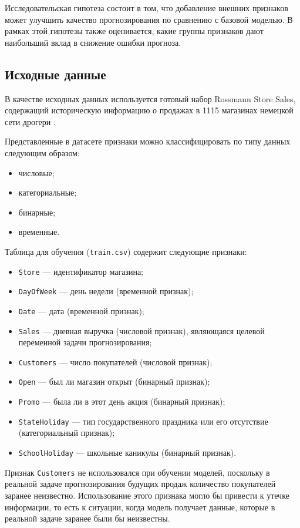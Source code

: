 \documentclass[12pt,a4paper]{article}
\numberwithin{equation}{section}
\begin{document}
Исследовательская гипотеза состоит в том, что добавление внешних признаков может улучшить качество прогнозирования по сравнению с базовой моделью. В рамках этой гипотезы также оценивается, какие группы признаков дают наибольший вклад в снижение ошибки прогноза.

\subsection{Исходные данные}

В качестве исходных данных используется готовый набор Rossmann Store Sales, содержащий историческую информацию о продажах в 1115 магазинах немецкой сети дрогери \cite{kaggle2015rossmann}.

Представленные в датасете признаки можно классифицировать по типу данных следующим образом:
\begin{itemize}
    \item числовые;
    \item категориальные;
    \item бинарные;
    \item временные.
\end{itemize}

Таблица для обучения (\texttt{train.csv}) содержит следующие признаки:
\begin{itemize}
    \item \texttt{Store} — идентификатор магазина;
    \item \texttt{DayOfWeek} — день недели (временной признак);
    \item \texttt{Date} — дата (временной признак);
    \item \texttt{Sales} — дневная выручка (числовой признак), являющаяся целевой переменной задачи прогнозирования;
    \item \texttt{Customers} — число покупателей (числовой признак);
    \item \texttt{Open} — был ли магазин открыт (бинарный признак);
    \item \texttt{Promo} — была ли в этот день акция (бинарный признак);
    \item \texttt{StateHoliday} — тип государственного праздника или его отсутствие (категориальный признак);
    \item \texttt{SchoolHoliday} — школьные каникулы (бинарный признак).
\end{itemize}
Признак \texttt{Customers} не использовался при обучении моделей, поскольку в реальной задаче прогнозирования будущих продаж количество покупателей заранее неизвестно. Использование этого признака могло бы привести к утечке информации, то есть к ситуации, когда модель получает данные, которые в реальной задаче заранее были бы неизвестны.
\end{document}
